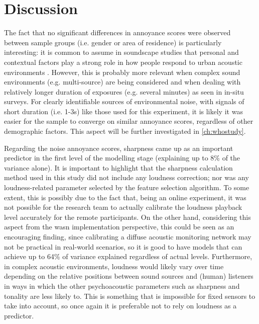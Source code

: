 
\section{Discussion}

The fact that no significant differences in annoyance scores were observed between sample groups (i.e. gender or area of residence) is particularly interesting: it is common to assume in soundscape studies that personal and contextual factors play a strong role in how people respond to urban acoustic environments \citep{Kang2016Ten}. However, this is probably more relevant when complex sound environments (e.g. multi-source) are being considered and when dealing with relatively longer duration of exposures (e.g. several minutes) as seen in in-situ surveys. For clearly identifiable sources of environmental noise, with signals of short duration (i.e. 1-3s) like those used for this experiment, it is likely it was easier for the sample to converge on similar annoyance scores, regardless of other demographic factors. This aspect will be further investigated in \cref{ch:whostudy}.

Regarding the noise annoyance scores, sharpness came up as an important predictor in the first level of the modelling stage (explaining up to 8\% of the variance alone). It is important to highlight that the sharpness calculation method used in this study did not include any loudness correction; nor was any loudness-related parameter selected by the feature selection algorithm. To some extent, this is possibly due to the fact that, being an online experiment, it was not possible for the research team to actually calibrate the loudness playback level accurately for the remote participants. On the other hand, considering this aspect from the \gls{wasn} implementation perspective, this could be seen as an encouraging finding, since calibrating a diffuse acoustic monitoring network may not be practical in real-world scenarios, so it is good to have models that can achieve up to 64\% of variance explained regardless of actual levels. Furthermore, in complex acoustic environments, loudness would likely vary over time depending on the relative positions between sound sources and (human) listeners in ways in which the other psychoacoustic parameters such as sharpness and tonality are less likely to. This is something that is impossible for fixed sensors to take into account, so once again it is preferable not to rely on loudness as a predictor.

